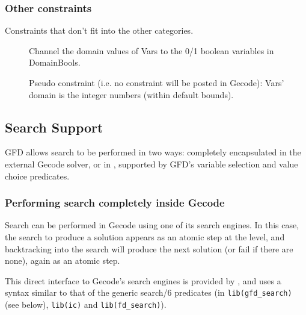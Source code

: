 \subsubsection{Other constraints}

Constraints that don't fit into the other categories.

\begin{description}

\item[]
Channel the domain values of Vars to the 0/1 boolean variables in DomainBools.

\item[]
Pseudo constraint (i.e. no constraint will be posted in Gecode):
Vars' domain is the integer numbers (within default bounds).

\end{description}

\subsection{Search Support}

GFD allows search to be performed in two ways: 
completely encapsulated in the external Gecode solver, or
in {\eclipse}, supported by GFD's variable selection 
and value choice predicates. 

\subsubsection{Performing search completely inside Gecode}
\label{searcheng}
Search can be performed in Gecode using one of its search engines. 
In this 
case, the search to produce a solution appears as an atomic step at
the {\eclipse} level, and backtracking into the search will produce the next 
solution (or fail if there are none), again as an atomic step.

This direct interface to Gecode's search engines is provided by
,
and uses a syntax similar to that of the generic search/6 predicates
(in {\tt lib(gfd_search)} (see below), {\tt lib(ic)} and {\tt lib(fd_search)}). 

